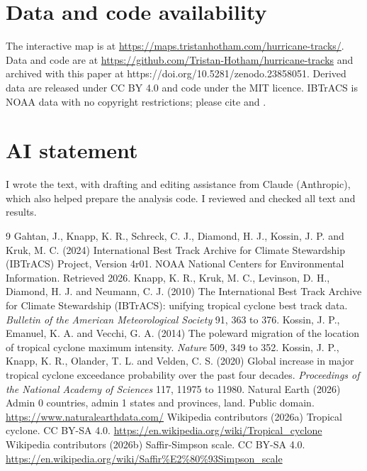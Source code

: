 \documentclass[11pt,a4paper]{article}
\begin{document}
\section*{Data and code availability}
The interactive map is at \url{https://maps.tristanhotham.com/hurricane-tracks/}. Data and code are at \url{https://github.com/Tristan-Hotham/hurricane-tracks} and archived with this paper at https://doi.org/10.5281/zenodo.23858051. Derived data are released under CC BY 4.0 and code under the MIT licence. IBTrACS is NOAA data with no copyright restrictions; please cite \citet{knapp2010} and \citet{gahtan2024}.

\section*{AI statement}
I wrote the text, with drafting and editing assistance from Claude (Anthropic), which also helped prepare the analysis code. I reviewed and checked all text and results.

\begin{thebibliography}{9}
 Gahtan, J., Knapp, K. R., Schreck, C. J., Diamond, H. J., Kossin, J. P. and Kruk, M. C. (2024) International Best Track Archive for Climate Stewardship (IBTrACS) Project, Version 4r01. NOAA National Centers for Environmental Information. Retrieved 2026.
 Knapp, K. R., Kruk, M. C., Levinson, D. H., Diamond, H. J. and Neumann, C. J. (2010) The International Best Track Archive for Climate Stewardship (IBTrACS): unifying tropical cyclone best track data. \emph{Bulletin of the American Meteorological Society} 91, 363 to 376.
 Kossin, J. P., Emanuel, K. A. and Vecchi, G. A. (2014) The poleward migration of the location of tropical cyclone maximum intensity. \emph{Nature} 509, 349 to 352.
 Kossin, J. P., Knapp, K. R., Olander, T. L. and Velden, C. S. (2020) Global increase in major tropical cyclone exceedance probability over the past four decades. \emph{Proceedings of the National Academy of Sciences} 117, 11975 to 11980.
 Natural Earth (2026) Admin 0 countries, admin 1 states and provinces, land. Public domain. \url{https://www.naturalearthdata.com/}
 Wikipedia contributors (2026a) Tropical cyclone. CC BY-SA 4.0. \url{https://en.wikipedia.org/wiki/Tropical_cyclone}
 Wikipedia contributors (2026b) Saffir-Simpson scale. CC BY-SA 4.0. \url{https://en.wikipedia.org/wiki/Saffir\%E2\%80\%93Simpson_scale}
\end{thebibliography}
\end{document}
